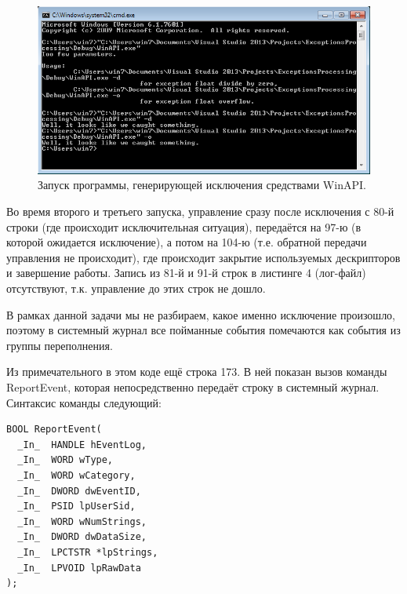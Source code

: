 \documentclass[a4paper, 12pt]{report}		%
\begin{document}
\begin{figure}[h!]
\centering
\includegraphics[scale=0.95]{res/001}
\caption{Запуск программы, генерирующей исключения средствами WinAPI.}
\end{figure}

Во время второго и третьего запуска, управление сразу после исключения с 80-й строки (где происходит исключительная ситуация),  передаётся на 97-ю (в которой ожидается исключение), а потом на 104-ю (т.е. обратной передачи управления не происходит), где происходит закрытие используемых дескрипторов и завершение работы. Запись из 81-й и 91-й строк в листинге 4 (лог-файл) отсутствуют, т.к. управление до этих строк не дошло.

В рамках данной задачи мы не разбираем, какое именно исключение произошло, поэтому в системный журнал все пойманные события помечаются как события из группы переполнения.



Из примечательного в этом коде ещё строка 173. В ней показан вызов команды ReportEvent, которая непосредственно передаёт строку в системный журнал. Синтаксис команды следующий:

\begin{verbatim}
BOOL ReportEvent(
  _In_  HANDLE hEventLog,
  _In_  WORD wType,
  _In_  WORD wCategory,
  _In_  DWORD dwEventID,
  _In_  PSID lpUserSid,
  _In_  WORD wNumStrings,
  _In_  DWORD dwDataSize,
  _In_  LPCTSTR *lpStrings,
  _In_  LPVOID lpRawData
);
\end{verbatim}
\end{document}
